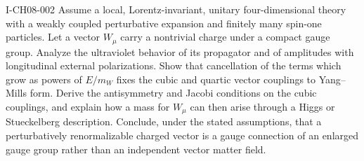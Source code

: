 \begin{exercise}{I-CH08-002}
Assume a local, Lorentz-invariant, unitary four-dimensional theory with a
weakly coupled perturbative expansion and finitely many spin-one particles.
Let a vector $W_\mu$ carry a nontrivial charge under a compact gauge group.
Analyze the ultraviolet behavior of its propagator and of amplitudes with
longitudinal external polarizations.  Show that cancellation of the terms
which grow as powers of $E/m_W$ fixes the cubic and quartic vector couplings
to Yang--Mills form.  Derive the antisymmetry and Jacobi conditions on the
cubic couplings, and explain how a mass for $W_\mu$ can then arise through a
Higgs or Stueckelberg description.  Conclude, under the stated assumptions,
that a perturbatively renormalizable charged vector is a gauge connection of
an enlarged gauge group rather than an independent vector matter field.
\end{exercise}
